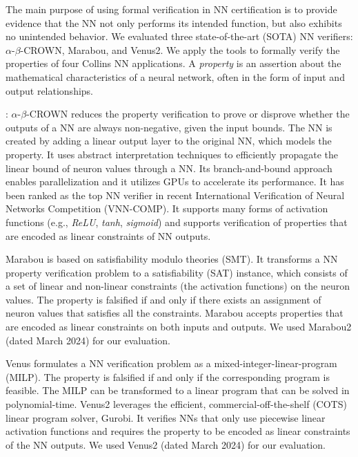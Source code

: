 The main purpose of using formal verification in NN certification is to provide evidence that the NN not only performs its intended function, but also exhibits no unintended behavior. 
We evaluated three state-of-the-art (SOTA) NN verifiers: $\alpha$-$\beta$-CROWN, Marabou, and Venus2. We apply the tools to formally verify the properties of four Collins NN applications. A \textit{property} is an assertion about the mathematical characteristics of a neural network, often in the form of input and output relationships.

: 
$\alpha$-$\beta$-CROWN \cite{abcrown} reduces the property verification to prove or disprove whether the outputs of a NN are always non-negative, given the input bounds. The NN is created by adding a linear output layer to the original NN, which models the property. It uses abstract interpretation techniques to efficiently propagate the linear bound of neuron values through a NN. Its branch-and-bound approach enables parallelization and it utilizes GPUs to accelerate its performance. It has been ranked as the top NN verifier in recent International Verification of Neural Networks Competition (VNN-COMP). It supports many forms of activation functions (e.g., \textit{ReLU}, \textit{tanh}, \textit{sigmoid}) and supports verification of properties that are encoded as linear constraints of NN outputs.

Marabou \cite{marabou} \cite{marabou2} is based on satisfiability modulo theories (SMT). It transforms a NN property verification problem to a satisfiability (SAT) instance, which consists of a set of linear and non-linear constraints (the activation functions) on the neuron values. The property is falsified if and only if there exists an assignment of neuron values that satisfies all the constraints. Marabou accepts properties that are encoded as linear constraints on both inputs and outputs. We used Marabou2 (dated March 2024) for our evaluation.

Venus \cite{venus} formulates a NN verification problem as a mixed-integer-linear-program (MILP). The property is falsified if and only if the corresponding program is feasible. The MILP can be transformed to a linear program that can be solved in polynomial-time. Venus2 leverages the efficient, commercial-off-the-shelf (COTS) linear program solver, Gurobi. It verifies NNs that only use piecewise linear activation functions and requires the property to be encoded as linear constraints of the NN outputs. We used Venus2 (dated March 2024) for our evaluation.

